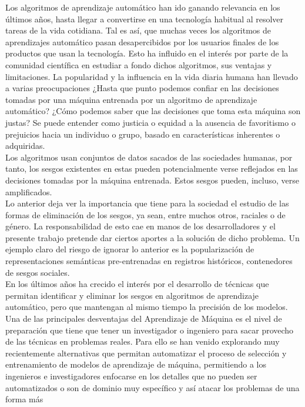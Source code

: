 \documentclass[runningheads,a4paper]{llncs}
\begin{document}
	Los algoritmos de aprendizaje automático han ido ganando  relevancia en los últimos años, hasta llegar a convertirse en una tecnología habitual al resolver tareas de la vida cotidiana. Tal es así, que muchas veces los algoritmos de aprendizajes automático pasan desapercibidos por los usuarios finales de los productos que usan la tecnología. Esto ha influido en el interés por parte de la comunidad científica en estudiar a fondo dichos algoritmos, sus ventajas y limitaciones. La popularidad y la influencia en la vida diaria humana han llevado a varias preocupaciones ¿Hasta que punto podemos confiar en las decisiones tomadas por una máquina entrenada por un algoritmo de aprendizaje automático? ¿Cómo podemos saber que las decisiones que toma esta máquina son justas? Se puede entender como justicia o equidad a la ausencia de favoritismo o prejuicios hacia un individuo o grupo, basado en características inherentes o adquiridas.\\
	Los algoritmos usan conjuntos de datos sacados de las sociedades humanas, por tanto, los sesgos existentes en estas pueden potencialmente verse reflejados en las decisiones tomadas por la máquina entrenada. Estos sesgos pueden, incluso, verse amplificados.\\
	Lo anterior deja ver la importancia que tiene para la sociedad el estudio de las formas de eliminación de los sesgos, ya sean, entre muchos otros, raciales o de género. La responsabilidad de esto cae en manos de los desarrolladores y el presente trabajo pretende dar ciertos aportes a la solución de dicho problema. Un ejemplo claro del riesgo de ignorar lo anterior es la popularización de representaciones semánticas pre-entrenadas en registros históricos, contenedores de sesgos sociales.\\
	En los últimos años ha crecido el interés por el desarrollo de técnicas que permitan identificar y eliminar los sesgos en algoritmos de aprendizaje automático, pero que mantengan al mismo tiempo la precisión de los modelos.\\	
	Una de las principales desventajas del Aprendizaje de Máquina es el nivel de preparación que tiene que
	tener un investigador o ingeniero para sacar provecho de las técnicas en problemas reales.
	Para ello se han venido explorando muy recientemente alternativas que permitan
	automatizar el proceso de selección y entrenamiento de modelos de aprendizaje de máquina,
	permitiendo a los ingenieros e investigadores enfocarse en los detalles que no pueden ser
	automatizados o son de dominio muy específico y así atacar los problemas de una forma más
\end{document}
